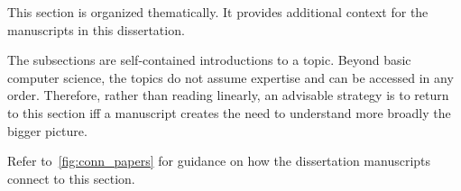 
This section is organized thematically.
It provides additional context for the manuscripts in this dissertation.

The subsections are self-contained introductions to a topic.
Beyond basic computer science, the topics do not assume expertise and can be accessed in any order.
Therefore, rather than reading linearly, an advisable strategy is to return to this section iff a manuscript creates the need to understand more broadly the {bigger picture}.

Refer to~\autoref{fig:conn_papers} for guidance on how the dissertation manuscripts connect to this section.
